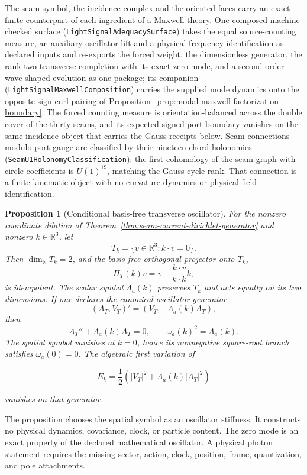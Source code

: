 \documentclass[11pt]{article}
\newtheorem{proposition}[theorem]{Proposition}
\theoremstyle{remark}
\theoremstyle{plain}
\begin{document}
The seam symbol, the incidence complex and the oriented faces carry an exact
finite counterpart of each ingredient of a Maxwell theory. One composed
machine-checked surface (\texttt{LightSignalAdequacySurface}) takes the equal
source-counting measure, an auxiliary oscillator lift and a
physical-frequency identification as declared inputs and re-exports the
forced weight, the dimensionless generator, the rank-two transverse
completion with its exact zero mode, and a second-order wave-shaped evolution
as one package; its companion (\texttt{LightSignalMaxwellComposition})
carries the supplied mode dynamics onto the opposite-sign curl pairing of
Proposition~\ref{prop:modal-maxwell-factorization-boundary}. The forced
counting measure is orientation-balanced across the double cover of the
thirty seams, and its expected signed port boundary vanishes on the same
incidence object that carries the Gauss receipts below. Seam connections
modulo port gauge are classified by their nineteen chord holonomies
(\texttt{SeamU1HolonomyClassification}): the first cohomology of the seam
graph with circle coefficients is \(U(1)^{19}\), matching the Gauss cycle
rank. That connection is a finite kinematic object with no curvature
dynamics or physical field identification.

\begin{proposition}[Conditional basis-free transverse oscillator]
\label{prop:seam-current-transverse-oscillator}
For the nonzero coordinate dilation of
Theorem~\ref{thm:seam-current-dirichlet-generator} and nonzero
\(k\in\mathbb R^3\), let
\[
T_k=\{v\in\mathbb R^3:k\mathbin{\cdot}v=0\}.
\]
Then \(\dim_{\mathbb R}T_k=2\), and the basis-free orthogonal projector onto
\(T_k\),
\[
\Pi_T(k)v=v-\frac{k\mathbin{\cdot}v}{k\mathbin{\cdot}k}k,
\]
is idempotent. The scalar symbol
\(\Lambda_a(k)\) preserves \(T_k\) and acts equally on its two dimensions. If
one declares the canonical oscillator generator
\[
(A_T,V_T)'=(V_T,-\Lambda_a(k)A_T),
\]
then
\[
A_T''+\Lambda_a(k)A_T=0,
\qquad \omega_a(k)^2=\Lambda_a(k).
\]
The spatial symbol vanishes at \(k=0\), hence its nonnegative square-root
branch satisfies \(\omega_a(0)=0\).
The algebraic first variation of

\[
E_k=\frac12\left(|V_T|^2+\Lambda_a(k)|A_T|^2\right)
\]

vanishes on that generator.
\end{proposition}

The proposition chooses the spatial symbol as an oscillator stiffness. It
constructs no physical dynamics, covariance, clock, or particle content. The zero mode is an exact property of the declared
mathematical oscillator. A physical photon statement requires the missing
sector, action, clock, position, frame, quantization, and pole attachments.
\end{document}
